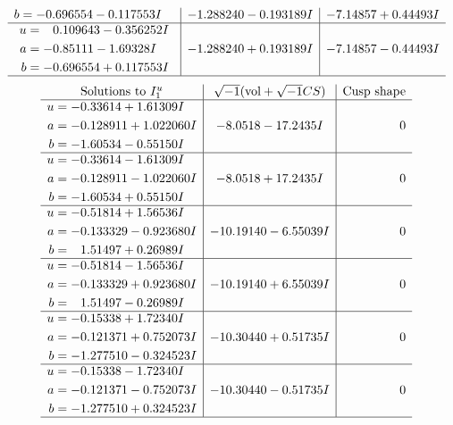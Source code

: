 \documentclass[1p]{elsarticle_modified}
\theoremstyle{definition}
\newcommand{\I}{\sqrt{-1}}
\begin{document}
$$\begin{array}{c|c|c}
\begin{aligned}
b &= -0.696554 - 0.117553 I\end{aligned}
 & -1.288240 - 0.193189 I & -7.14857 + 0.44493 I \\ \hline\begin{aligned}
u &= \phantom{-}0.109643 - 0.356252 I \\
a &= -0.85111 - 1.69328 I \\
b &= -0.696554 + 0.117553 I\end{aligned}
 & -1.288240 + 0.193189 I & -7.14857 - 0.44493 I\\
 \hline 
 \end{array}$$\newpage$$\begin{array}{c|c|c}  
\text{Solutions to }I^u_{1}& \I (\text{vol} + \sqrt{-1}CS) & \text{Cusp shape}\\
 \hline 
\begin{aligned}
u &= -0.33614 + 1.61309 I \\
a &= -0.128911 + 1.022060 I \\
b &= -1.60534 - 0.55150 I\end{aligned}
 & -8.0518 - 17.2435 I & \phantom{-0.000000 } 0 \\ \hline\begin{aligned}
u &= -0.33614 - 1.61309 I \\
a &= -0.128911 - 1.022060 I \\
b &= -1.60534 + 0.55150 I\end{aligned}
 & -8.0518 + 17.2435 I & \phantom{-0.000000 } 0 \\ \hline\begin{aligned}
u &= -0.51814 + 1.56536 I \\
a &= -0.133329 - 0.923680 I \\
b &= \phantom{-}1.51497 + 0.26989 I\end{aligned}
 & -10.19140 - 6.55039 I & \phantom{-0.000000 } 0 \\ \hline\begin{aligned}
u &= -0.51814 - 1.56536 I \\
a &= -0.133329 + 0.923680 I \\
b &= \phantom{-}1.51497 - 0.26989 I\end{aligned}
 & -10.19140 + 6.55039 I & \phantom{-0.000000 } 0 \\ \hline\begin{aligned}
u &= -0.15338 + 1.72340 I \\
a &= -0.121371 + 0.752073 I \\
b &= -1.277510 - 0.324523 I\end{aligned}
 & -10.30440 + 0.51735 I & \phantom{-0.000000 } 0 \\ \hline\begin{aligned}
u &= -0.15338 - 1.72340 I \\
a &= -0.121371 - 0.752073 I \\
b &= -1.277510 + 0.324523 I\end{aligned}
 & -10.30440 - 0.51735 I & \phantom{-0.000000 } 0\\
 \hline 
 \end{array}$$\newpage\newpage\renewcommand{\arraystretch}{1}
\end{document}
